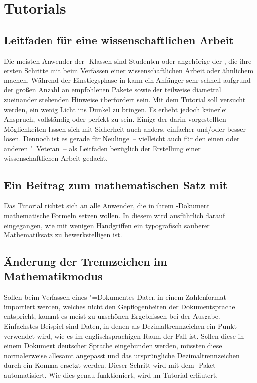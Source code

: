 \chapter{%
  Tutorials%
  \label{sec:tut}%
}
\section{%
  Leitfaden für eine wissenschaftlichen Arbeit%
}

Die meisten Anwender der \TUDScript-Klassen sind Studenten oder angehörige der 
\TnUD, die ihre ersten Schritte mit  beim Verfassen einer 
wissenschaftlichen Arbeit oder ähnlichem machen. Während der Einstiegsphase in 
 kann ein Anfänger sehr schnell aufgrund der großen Anzahl an 
empfohlenen Pakete sowie der teilweise diametral zueinander stehenden Hinweise 
überfordert sein. Mit dem Tutorial  soll versucht 
werden, ein wenig Licht ins Dunkel zu bringen. Es erhebt jedoch keinerlei 
Anspruch, vollständig oder perfekt zu sein. Einige der darin vorgestellten 
Möglichkeiten lassen sich mit Sicherheit auch anders, einfacher und/oder 
besser lösen. Dennoch ist es gerade für Neulinge~-- vielleicht auch für den 
einen oder anderen "~Veteran~-- als Leitfaden bezüglich der 
Erstellung einer wissenschaftlichen Arbeit gedacht.



\section{%
  Ein Beitrag zum mathematischen Satz mit %
}

Das Tutorial  richtet sich an alle Anwender, die in 
ihrem -Dokument mathematische Formeln setzen wollen. In diesem 
wird ausführlich darauf eingegangen, wie mit wenigen Handgriffen ein 
typografisch sauberer Mathematiksatz zu bewerkstelligen ist.



\section{%
  Änderung der Trennzeichen im Mathematikmodus%
}

Sollen beim Verfassen eines "=Dokumentes Daten in einem 
Zahlenformat importiert werden, welches nicht den Gepflogenheiten der 
Dokumentsprache entspricht, kommt es meist zu unschönen Ergebnissen bei der 
Ausgabe. Einfachstes Beispiel sind Daten, in denen als Dezimaltrennzeichen ein 
Punkt verwendet wird, wie es im englischsprachigen Raum der Fall ist. Sollen 
diese in einem Dokument deutscher Sprache eingebunden werden, müssten diese 
normalerweise allesamt angepasst und das ursprüngliche Dezimaltrennzeichen 
durch ein Komma ersetzt werden. Dieser Schritt wird mit dem \TUDScript-Paket 
 automatisiert. Wie dies genau funktioniert, wird im Tutorial 
 erläutert.%
%
